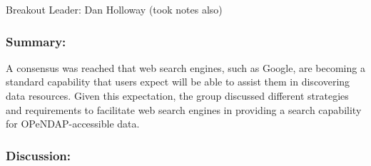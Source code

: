 Breakout Leader: Dan Holloway (took notes also)

\subsubsection{Summary:}
 
  A consensus was reached that web search engines, such as Google, 
are becoming a standard capability that users expect will be able 
to assist them in discovering data resources.  Given this expectation,
the group discussed different strategies and requirements to 
facilitate web search engines in providing a search capability for 
OPeNDAP-accessible data.

\subsubsection{Discussion:}

